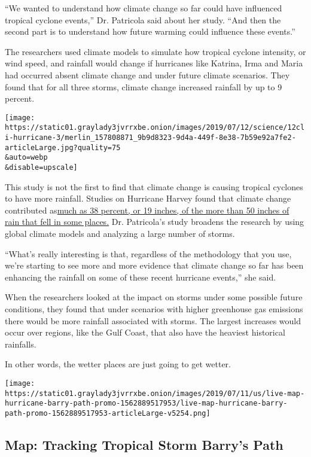 ``We wanted to understand how climate change so far could have
influenced tropical cyclone events,'' Dr. Patricola said about her
study. ``And then the second part is to understand how future warming
could influence these events.''

The researchers used climate models to simulate how tropical cyclone
intensity, or wind speed, and rainfall would change if hurricanes like
Katrina, Irma and Maria had occurred absent climate change and under
future climate scenarios. They found that for all three storms, climate
change increased rainfall by up to 9 percent.

\texttt{[image: https://static01.graylady3jvrrxbe.onion/images/2019/07/12/science/12cli-hurricane-3/merlin\_157808871\_9b9d8323-9d4a-449f-8e38-7b59e92a7fe2-articleLarge.jpg?quality=75\\\&auto=webp\\\&disable=upscale]}

This study is not the first to find that climate change is causing
tropical cyclones to have more rainfall. Studies on Hurricane Harvey
found that climate change contributed
as\href{https://www.nytimes3xbfgragh.onion/2017/12/13/climate/hurricane-harvey-climate-change.html}{much
as 38 percent, or 19 inches, of the more than 50 inches of rain that
fell in some places.} Dr. Patricola's study broadens the research by
using global climate models and analyzing a large number of storms.

``What's really interesting is that, regardless of the methodology that
you use, we're starting to see more and more evidence that climate
change so far has been enhancing the rainfall on some of these recent
hurricane events,'' she said.

When the researchers looked at the impact on storms under some possible
future conditions, they found that under scenarios with higher
greenhouse gas emissions there would be more rainfall associated with
storms. The largest increases would occur over regions, like the Gulf
Coast, that also have the heaviest historical rainfalls.

In other words, the wetter places are just going to get wetter.

\href{https://www.nytimes3xbfgragh.onion/interactive/2019/07/11/us/hurricane-barry-map-tracker.html}{}

\texttt{[image: https://static01.graylady3jvrrxbe.onion/images/2019/07/11/us/live-map-hurricane-barry-path-promo-1562889517953/live-map-hurricane-barry-path-promo-1562889517953-articleLarge-v5254.png]}

\hypertarget{map-tracking-tropical-storm-barrys-path}{%
\subsection{Map: Tracking Tropical Storm Barry's
Path}\label{map-tracking-tropical-storm-barrys-path}}

